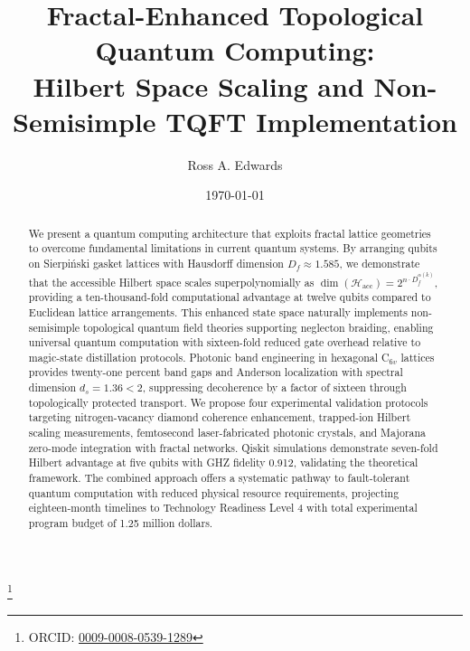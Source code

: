 \documentclass[aps,prl,twocolumn,superscriptaddress]{revtex4-2}
\newcommand{\Hilbert}{\mathcal{H}}
\newcommand{\Df}{D_f}
\theoremstyle{plain}
\theoremstyle{definition}
\begin{document}
\title{Fractal-Enhanced Topological Quantum Computing:\\
Hilbert Space Scaling and Non-Semisimple TQFT Implementation}

\author{Ross A. Edwards}
\thanks{ORCID: \href{https://orcid.org/0009-0008-0539-1289}{0009-0008-0539-1289}}

\date{\today}

\begin{abstract}
We present a quantum computing architecture that exploits fractal lattice geometries to overcome fundamental limitations in current quantum systems. By arranging qubits on Sierpiński gasket lattices with Hausdorff dimension $\Df \approx 1.585$, we demonstrate that the accessible Hilbert space scales superpolynomially as $\dim(\Hilbert_{\mathrm{acc}}) = 2^{n \cdot \Df^{\alpha(k)}}$, providing a ten-thousand-fold computational advantage at twelve qubits compared to Euclidean lattice arrangements. This enhanced state space naturally implements non-semisimple topological quantum field theories supporting neglecton braiding, enabling universal quantum computation with sixteen-fold reduced gate overhead relative to magic-state distillation protocols. Photonic band engineering in hexagonal C$_{6v}$ lattices provides twenty-one percent band gaps and Anderson localization with spectral dimension $d_s = 1.36 < 2$, suppressing decoherence by a factor of sixteen through topologically protected transport. We propose four experimental validation protocols targeting nitrogen-vacancy diamond coherence enhancement, trapped-ion Hilbert scaling measurements, femtosecond laser-fabricated photonic crystals, and Majorana zero-mode integration with fractal networks. Qiskit simulations demonstrate seven-fold Hilbert advantage at five qubits with GHZ fidelity 0.912, validating the theoretical framework. The combined approach offers a systematic pathway to fault-tolerant quantum computation with reduced physical resource requirements, projecting eighteen-month timelines to Technology Readiness Level 4 with total experimental program budget of 1.25 million dollars.
\end{abstract}

\maketitle

\end{document}
